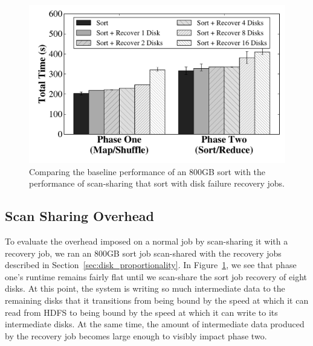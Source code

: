 \begin{figure}[t]
  \centering
  \includegraphics[width=\columnwidth]{fault_tolerance/graphs/scan_share_overhead.pdf}
  \caption{\label{fig:scan_sharing_overhead} Comparing the baseline performance
    of an 800GB sort with the performance of scan-sharing that sort with disk
    failure recovery jobs.}
\end{figure}

\subsection{Scan Sharing Overhead}
\label{sec:scan_sharing_overhead}

To evaluate the overhead imposed on a normal job by scan-sharing it with a
recovery job, we ran an 800GB sort job scan-shared with the recovery jobs
described in Section~\ref{sec:disk_proportionality}. In
Figure~\ref{fig:scan_sharing_overhead}, we see that phase one's runtime remains
fairly flat until we scan-share the sort job recovery of eight disks. At this
point, the system is writing so much intermediate data to the remaining disks
that it transitions from being bound by the speed at which it can read from
HDFS to being bound by the speed at which it can write to its intermediate
disks. At the same time, the amount of intermediate data produced by the
recovery job becomes large enough to visibly impact phase two.

